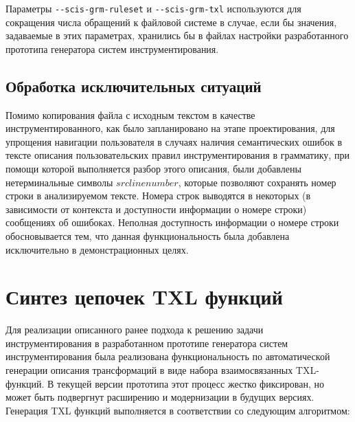 Параметры \lstinline{--scis-grm-ruleset} и \lstinline{--scis-grm-txl} используются для сокращения числа обращений к файловой системе в случае, если бы значения, задаваемые в этих параметрах, хранились бы в файлах настройки разработанного прототипа генератора систем инструментирования.

\subsection{Обработка исключительных ситуаций}

Помимо копирования файла с исходным текстом в качестве инструментированного, как было запланировано на этапе проектирования, для упрощения навигации пользователя в случаях наличия семантических ошибок в тексте описания пользовательских правил инструментирования в грамматику, при помощи которой выполняется разбор этого описания, были добавлены нетерминальные символы $srclinenumber$, которые позволяют сохранять номер строки в анализируемом тексте.
Номера строк выводятся в некоторых (в зависимости от контекста и доступности информации о номере строки) сообщениях об ошибоках.
Неполная доступность информации о номере строки обосновывается тем, что данная функциональность была добавлена исключительно в демонстрационных целях.

\section{Синтез цепочек TXL функций}

Для реализации описанного ранее подхода к решению задачи инструментирования в разработанном прототипе генератора систем инструментирования была реализована функциональность по автоматической генерации описания трансформаций в виде набора взаимосвязанных TXL-функций.
В текущей версии прототипа этот процесс жестко фиксирован, но может быть подвергнут расширению и модернизации в будущих версиях.
Генерация TXL функций выполняется в соответствии со следующим алгоритмом:


